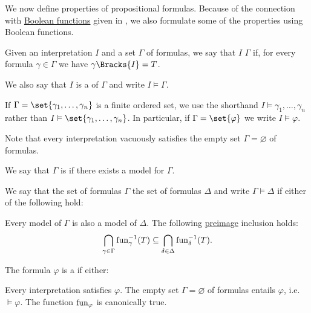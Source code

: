 \begin{definition}\label{def:propositional_semantics}\mcite\cite[def. 7.14]{OpenLogic20201202}
  We now define  properties of propositional formulas. Because of the connection with \hyperref[def:boolean_function]{Boolean functions} given in , we also formulate some of the properties using Boolean functions.

  \begin{thmenum}
     Given an interpretation \( I \) and a set \( \Gamma \) of formulas, we say that \( I \)  \( \Gamma \) if, for every formula \( \gamma \in \Gamma \) we have \( \gamma\Bracks{I} = T \).

    We also say that \( I \) is a  of \( \Gamma \) and write \( I \vDash \Gamma \).

    If \( \Gamma = \set{ \gamma_1, \ldots, \gamma_n } \) is a finite ordered set, we use the shorthand \( I \vDash \gamma_1, \ldots, \gamma_n \) rather than \( I \vDash \set{ \gamma_1, \ldots, \gamma_n } \). In particular, if \( \Gamma = \set{ \varphi } \) we write \( I \vDash \varphi \).

    Note that every interpretation vacuously satisfies the empty set \( \Gamma = \varnothing \) of formulas.

    We say that \( \Gamma \) is  if there exists a model for \( \Gamma \).

     We say that the set of formulas \( \Gamma \)  the set of formulas \( \Delta \) and write \( \Gamma \vDash \Delta \) if either of the following hold:
    \begin{itemize}
       Every model of \( \Gamma \) is also a model of \( \Delta \).
       The following \hyperref[def:function/preimage]{preimage} inclusion holds:
      \begin{equation*}
        \bigcap_{\gamma \in \Gamma} \operatorname{fun}_\gamma^{-1}(T) \subseteq \bigcap_{\delta \in \Delta} \operatorname{fun}_\delta^{-1}(T).
      \end{equation*}
    \end{itemize}

     The formula \( \varphi \) is a  if either:
    \begin{itemize}
       Every interpretation satisfies \( \varphi \).
       The empty set \( \Gamma = \varnothing \) of formulas entails \( \varphi \), i.e. \( \vDash \varphi \).
       The function \( \operatorname{fun}_\varphi \) is canonically true.
    \end{itemize}


\end{thmenum}
\end{definition}

